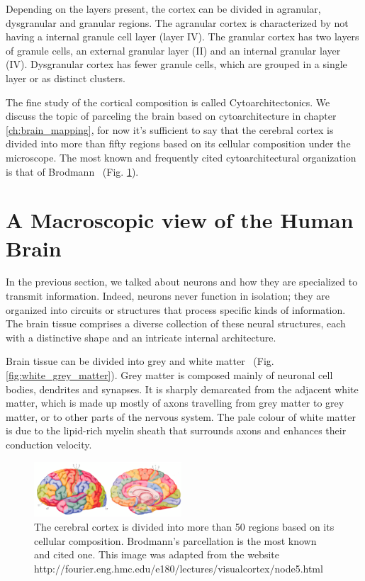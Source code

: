 Depending on the layers present, the cortex can be divided in agranular,
dysgranular and granular regions\cite{Mesulam1982}. The agranular cortex is characterized by not
having a internal granule cell layer (layer IV). The granular cortex has two 
layers of granule cells, an external granular layer (II) and an internal granular
layer (IV). Dysgranular cortex has fewer granule cells, which are grouped in a
single layer or as distinct clusters.



The fine study of the cortical composition is called Cytoarchitectonics. We 
discuss the topic of parceling the brain based on cytoarchitecture in chapter
\ref{ch:brain_mapping}, for now it's sufficient to say that the cerebral cortex is divided into more than
fifty regions based on its cellular composition under the microscope. The most
known and frequently cited cytoarchitectural organization is that of
Brodmann~\cite{Brodmann1909} (Fig. \ref{fig:brodmann_small}).


\section{A Macroscopic view of the Human Brain}
In the previous section, we talked about neurons and how they are specialized
to transmit information. Indeed, neurons never function in isolation; they are
organized into circuits or structures that process specific kinds of information.
The brain tissue comprises a diverse collection of these neural structures,
each with a distinctive shape and an intricate internal architecture.

Brain tissue can be divided into grey and white matter~\cite{Johns} (Fig. \ref{fig:white_grey_matter}).
Grey matter is composed mainly of neuronal cell bodies, dendrites and synapses.
It is sharply demarcated from the adjacent white matter, which is made up mostly
of axons travelling from grey matter to grey matter, or to other parts of the
nervous system. The pale colour of white matter is due to the lipid-rich myelin
sheath that surrounds axons and enhances their conduction velocity\cite{Johns}.
\begin{figure}[t]
    \includegraphics[width=0.49\textwidth]{2.neuroanatomy/img/brodmann.png}
    \caption{The cerebral cortex is divided into more than 50 regions based on
             its cellular composition. Brodmann's\cite{Brodmann1909}
             parcellation is the most known and cited one. This image was
             adapted from the website http://fourier.eng.hmc.edu/e180/lectures/visualcortex/node5.html}
    \label{fig:brodmann_small}
\end{figure}

